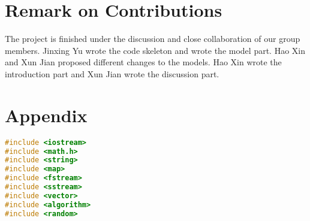 \documentclass{article}
\begin{document}


\section{Remark on Contributions}
The project is finished under the discussion and close collaboration of our group members. Jinxing Yu wrote the code skeleton and wrote the model part. Hao Xin and Xun Jian proposed different changes to the models. Hao Xin wrote the introduction part and Xun Jian wrote the discussion part.

\section*{Appendix}
\begin{lstlisting}[language=c++]
#include <iostream>
#include <math.h>
#include <string>
#include <map>
#include <fstream>
#include <sstream>
#include <vector>
#include <algorithm>
#include <random>


\end{lstlisting}
\end{document}
